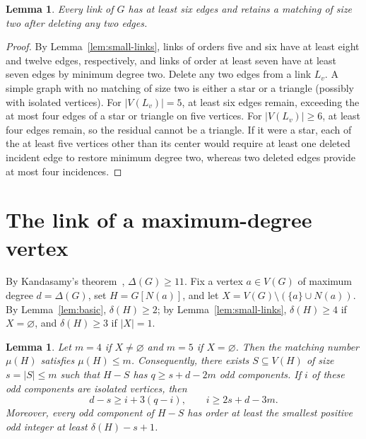 \documentclass[11pt]{article}
\newtheorem{lemma}[theorem]{Lemma}
\begin{document}
\begin{lemma}\label{lem:residual-matching}
Every link of $G$ has at least six edges and retains a matching of size two after deleting any two edges.
\end{lemma}

\begin{proof}
By Lemma~\ref{lem:small-links}, links of orders five and six have at least eight and twelve edges, respectively, and links of order at least seven have at least seven edges by minimum degree two. Delete any two edges from a link $L_v$. A simple graph with no matching of size two is either a star or a triangle (possibly with isolated vertices). For $|V(L_v)|=5$, at least six edges remain, exceeding the at most four edges of a star or triangle on five vertices. For $|V(L_v)|\geq 6$, at least four edges remain, so the residual cannot be a triangle. If it were a star, each of the at least five vertices other than its center would require at least one deleted incident edge to restore minimum degree two, whereas two deleted edges provide at most four incidences.
\end{proof}

\section{The link of a maximum-degree vertex}

By Kandasamy's theorem~\cite{Kandasamy}, $\Delta(G)\geq 11$. Fix a vertex $a\in V(G)$ of maximum degree $d=\Delta(G)$, set $H=G[N(a)]$, and let $X=V(G)\setminus(\{a\}\cup N(a))$. By Lemma~\ref{lem:basic}, $\delta(H)\geq 2$; by Lemma~\ref{lem:small-links}, $\delta(H)\geq 4$ if $X=\varnothing$, and $\delta(H)\geq 3$ if $|X|=1$.

\begin{lemma}\label{lem:tb}
Let $m=4$ if $X\neq\varnothing$ and $m=5$ if $X=\varnothing$. Then the matching number $\mu(H)$ satisfies $\mu(H)\leq m$. Consequently, there exists $S\subseteq V(H)$ of size $s=|S|\leq m$ such that $H-S$ has $q\geq s+d-2m$ odd components. If $i$ of these odd components are isolated vertices, then
\[
d-s\geq i+3(q-i), \qquad i\geq 2s+d-3m.
\]
Moreover, every odd component of $H-S$ has order at least the smallest positive odd integer at least $\delta(H)-s+1$.
\end{lemma}
\end{document}
